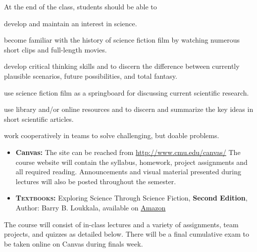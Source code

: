 \documentclass[11pt, a4paper]{article}
\begin{document}
\noindent At the end of the class, students should be able to
\begin{borderedsquare}
     \setlength\itemsep{0.3em}        
	\item develop and maintain an interest in science.
	\item become familiar with the history of science fiction film by watching
    numerous short clips and full-length movies.
    \item develop critical thinking skills and to discern the difference between
    currently plausible scenarios, future possibilities, and total fantasy.
    \item use science fiction film as a springboard for discussing current
    scientific research.
    \item use library and/or online resources and to discern and summarize the
    key ideas in short scientific articles.
    \item work cooperatively in teams to solve challenging, but doable problems.
\end{borderedsquare}

\begin{itemize}[itemsep=4pt,parsep=0pt,topsep=1pt,partopsep=1pt]
	\item[\color{darkblue}\faNewspaperO]\textbf{Canvas:} The site can be reached
	from \href{http://www.cmu.edu/canvas/}{http://www.cmu.edu/canvas/} The
	course website will contain the syllabus, homework, project assignments and
	all required reading. Announcements and visual material presented during
	lectures will also be posted throughout the semester.\\

	\item[\color{darkblue}\faBook] \textbf{\textsc{Textbooks:}} Exploring
    Science Through Science Fiction, \textbf{Second Edition}, Author: Barry B.
    Loukkala, available on
    \href{https://www.amazon.com/Exploring-Science-Through-Fiction-dp-3030293920/dp/3030293920/ref=dp_ob_title_bk}{Amazon}
\end{itemize}


\label{sec:eval-procudures}
\noindent The course will consist of in-class lectures and a variety of
assignments, team projects, and quizzes as detailed below. There will be a final
cumulative exam to be taken online on Canvas during finals week. 
\end{document}
